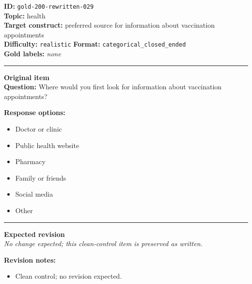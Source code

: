 \documentclass[10pt,a4paper]{article}
\newcommand{\sectionline}{\vspace{0.15em}\hrule\vspace{0.35em}}
\begin{document}
\begin{tcolorbox}[colframe=CleanGreen,colback=white,colbacktitle=CleanGreen!9,coltitle=black,title={Item 029\hfill Clean control}]
\textbf{ID:} \texttt{gold-200-rewritten-029}\\
\textbf{Topic:} health\\
\textbf{Target construct:} preferred source for information about vaccination appointments\\
\textbf{Difficulty:} \texttt{realistic} \quad \textbf{Format:} \texttt{categorical\_closed\_ended}\\
\textbf{Gold labels:} \textit{none}\\
\sectionline
\textbf{Original item}\\
\textbf{Question:} Where would you first look for information about vaccination appointments?
\par\textbf{Response options:}
\begin{itemize}
\item Doctor or clinic
\item Public health website
\item Pharmacy
\item Family or friends
\item Social media
\item Other
\end{itemize}
\sectionline
\textbf{Expected revision}\\
\textit{No change expected; this clean-control item is preserved as written.}
\par\textbf{Revision notes:}
\begin{itemize}
\item Clean control; no revision expected.
\end{itemize}
\end{tcolorbox}
\end{document}
